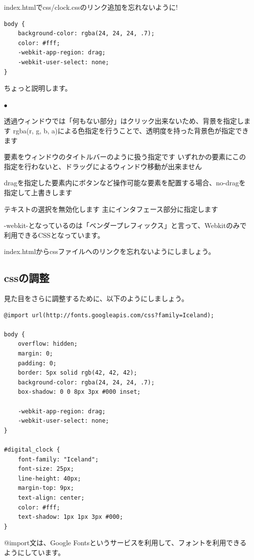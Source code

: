 \documentclass[mingoth,11pt,a4j,uplatex]{jsarticle}
\renewenvironment{description}%
{%
   \begin{list}{\parbox{1zw}{$\bullet$}}%
   {%
      \setlength{\topsep}{1zh}
      \setlength{\itemindent}{3zw}
      \setlength{\leftmargin}{5zw}%
      \setlength{\rightmargin}{0zw}%
      \setlength{\labelsep}{1zw}%
      \setlength{\labelwidth}{3zw}%
      \setlength{\itemsep}{0em}%
      \setlength{\parsep}{0em}%
      \setlength{\listparindent}{0zw}%
   }
}{%
   \end{list}%
}
\begin{document}
index.htmlでcss/clock.cssのリンク追加を忘れないように!

\begin{lstlisting}[caption=DigitalClock：css/clock.css ]
body {
    background-color: rgba(24, 24, 24, .7);
    color: #fff;
    -webkit-app-region: drag;
    -webkit-user-select: none;
}
\end{lstlisting}

ちょっと説明します。
\begin{description}
\item[背景色/背景画像]
透過ウィンドウでは「何もない部分」はクリック出来ないため、背景を指定します
rgba(r, g, b, a)による色指定を行うことで、透明度を持った背景色が指定できます
\item[webkit-app-region: drag;]
要素をウィンドウのタイトルバーのように扱う指定です
いずれかの要素にこの指定を行わないと、ドラッグによるウィンドウ移動が出来ません
\item[-webkit-app-region: no-drag;]
dragを指定した要素内にボタンなど操作可能な要素を配置する場合、no-dragを指定して上書きします
\item[-webkit-user-select: none;]
テキストの選択を無効化します
主にインタフェース部分に指定します
\end{description}

-webkit-となっているのは「ベンダープレフィックス」と言って、Webkitのみで利用できるCSSとなっています。

index.htmlからcssファイルへのリンクを忘れないようにしましょう。
\subsection{cssの調整}
見た目をさらに調整するために、以下のようにしましょう。
\begin{lstlisting}[caption=DigitalClock：css/clock.css ]
@import url(http://fonts.googleapis.com/css?family=Iceland);

body {
    overflow: hidden;
    margin: 0;
    padding: 0;
    border: 5px solid rgb(42, 42, 42);
    background-color: rgba(24, 24, 24, .7);
    box-shadow: 0 0 8px 3px #000 inset;

    -webkit-app-region: drag;
    -webkit-user-select: none;
}

#digital_clock {
    font-family: "Iceland";
    font-size: 25px;
    line-height: 40px;
    margin-top: 9px;
    text-align: center;
    color: #fff;
    text-shadow: 1px 1px 3px #000;
}
\end{lstlisting}

@import文は、Google Fontsというサービスを利用して、フォントを利用できるようにしています。
\end{document}
